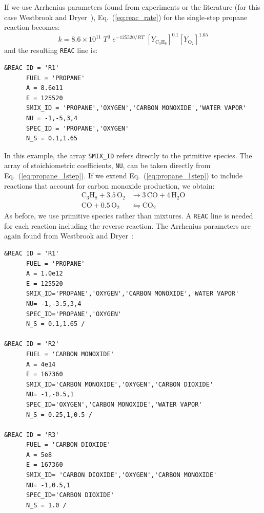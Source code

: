 \documentclass[11pt]{book}
\newcommand{\ct}{\tt\small}
\begin{document}
If we use Arrhenius parameters found from experiments or the literature (for this case Westbrook and Dryer~\cite{Westbrook:1}), Eq.~(\ref{eq:reac_rate}) for the single-step propane reaction becomes:
\begin{equation}\label{eq:reac_rate2}
k = 8.6 \times 10^{11} \; T^{0} \; e^{-125520/RT} \; [Y_{\mathrm{C_3H_8}}]^{0.1}[Y_{\mathrm{O_2}}]^{1.65}
\end{equation}
and the resulting {\ct REAC} line is:

\footnotesize
\begin{verbatim}
&REAC ID = 'R1'
      FUEL = 'PROPANE'
      A = 8.6e11
      E = 125520
      SMIX_ID = 'PROPANE','OXYGEN','CARBON MONOXIDE','WATER VAPOR'
      NU = -1,-5,3,4
      SPEC_ID = 'PROPANE','OXYGEN'
      N_S = 0.1,1.65
\end{verbatim} \normalsize

\noindent
In this example, the array {\ct SMIX\_ID} refers directly to the primitive species. The array of stoichiometric coefficients, {\ct NU}, can be taken directly from Eq.~(\ref{eq:propane_1step}). If we extend Eq.~(\ref{eq:propane_1step}) to include reactions that account for carbon monoxide production, we obtain:
\begin{align}\label{eq:propane_2step}
\mathrm{C_3H_8+3.5 \, O_2}&\rightarrow  \mathrm{3\,CO+4 \, H_2O} \\
\nonumber \mathrm{CO + 0.5 \, O_2} &\leftrightharpoons \mathrm{CO_2}
\end{align}
As before, we use primitive species rather than mixtures. A {\ct REAC} line is needed for each reaction including the reverse reaction. The Arrhenius parameters are again found from Westbrook and Dryer~\cite{Westbrook:1}:

\footnotesize
\begin{verbatim}
&REAC ID = 'R1'
      FUEL = 'PROPANE'
      A = 1.0e12
      E = 125520
      SMIX_ID='PROPANE','OXYGEN','CARBON MONOXIDE','WATER VAPOR'
      NU= -1,-3.5,3,4
      SPEC_ID='PROPANE','OXYGEN'
      N_S = 0.1,1.65 /

&REAC ID = 'R2'
      FUEL = 'CARBON MONOXIDE'
      A = 4e14
      E = 167360
      SMIX_ID='CARBON MONOXIDE','OXYGEN','CARBON DIOXIDE'
      NU= -1,-0.5,1
      SPEC_ID='OXYGEN','CARBON MONOXIDE','WATER VAPOR'
      N_S = 0.25,1,0.5 /

&REAC ID = 'R3'
      FUEL = 'CARBON DIOXIDE'
      A = 5e8
      E = 167360
      SMIX_ID= 'CARBON DIOXIDE','OXYGEN','CARBON MONOXIDE'
      NU= -1,0.5,1
      SPEC_ID='CARBON DIOXIDE'
      N_S = 1.0 /
\end{verbatim} \normalsize
\end{document}
